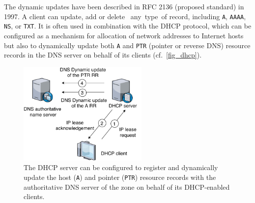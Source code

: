 The dynamic updates have been described in RFC 2136 (proposed standard) \cite{rfc2136} in 1997. 
A client can update, add or delete~%
any~type~of record, including \texttt{A}, \texttt{AAAA}, \texttt{NS}, or \texttt{TXT}.
It is often used %
in combination with the DHCP protocol, which can be configured %
as a mechanism for allocation of network addresses to Internet hosts but also to dynamically update both \texttt{A} and \texttt{PTR} (pointer or reverse  DNS) resource records in the DNS server %
on behalf of its clients (cf.~\autoref{fig_dhcp}).

\begin{figure}[!ht]
\centering
\includegraphics[width=2.5in]{figs/dhcp.pdf}
\caption{The DHCP server can be configured to register and dynamically update the host (\texttt{A}) and pointer (\texttt{PTR}) resource records with the authoritative DNS server of the zone on behalf of its DHCP-enabled clients.
}
\label{fig_dhcp}
\end{figure}



%




